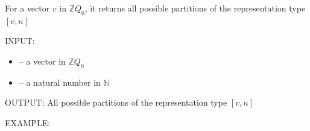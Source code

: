\documentclass[letterpaper,10pt,english]{sphinxmanual}
\begin{document}
\begin{fulllineitems}
\label{\detokenize{index:quivercombinatorics.small_decomposition}}
\pysigstartsignatures
\pysiglinewithargsret
{}
{\sphinxparamcomma {}}
{}
\pysigstopsignatures
\sphinxAtStartPar
For a vector \(v\) in \(\mathbb{Z}Q_0\), it returns all possible partitions of the representation type \([v,n]\)

\sphinxAtStartPar
INPUT:
\begin{itemize}
\item {} 
\sphinxAtStartPar
{} – a vector in \(\mathbb{Z}Q_0\)

\item {} 
\sphinxAtStartPar
{} – a natural number in \(\mathbb{N}\)

\end{itemize}

\sphinxAtStartPar
OUTPUT: All possible partitions of the representation type \([v,n]\)

\sphinxAtStartPar
EXAMPLE:

\begin{sphinxVerbatim}[commandchars=\\\{\}]
  
   
\PYG{p}{[}\PYG{p}{[}\PYG{p}{[}  \PYG{p}{]} \PYG{p}{[}  \PYG{p}{]} \PYG{p}{[}  \PYG{p}{]}\PYG{p}{]}
\PYG{p}{[}\PYG{p}{[}  \PYG{p}{]} \PYG{p}{[}  \PYG{p}{]}\PYG{p}{]}
\PYG{p}{[}\PYG{p}{[}  \PYG{p}{]}\PYG{p}{]}\PYG{p}{]}
\end{sphinxVerbatim}

\end{fulllineitems}
\end{document}
